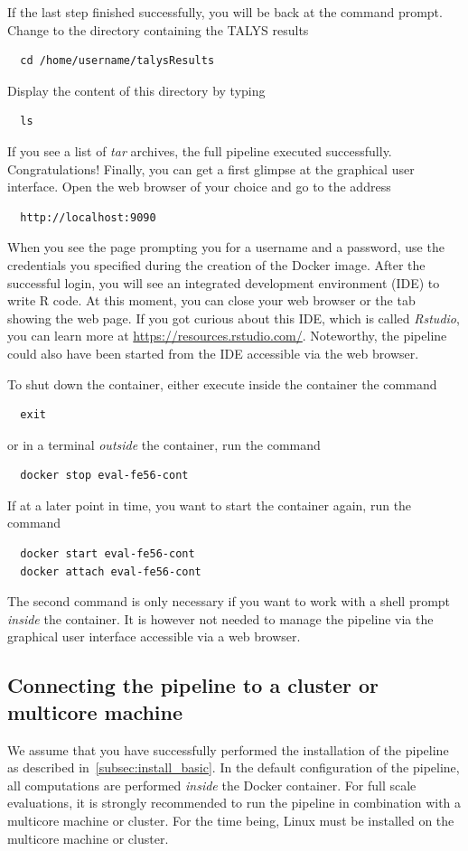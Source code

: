 \documentclass[12pt,a4paper]{scrartcl}
\begin{document}
If the last step finished successfully, you will be back at the command prompt.
Change to the directory containing the TALYS results
\begin{verbatim}
  cd /home/username/talysResults
\end{verbatim}
Display the content of this directory by typing
\begin{verbatim}
  ls
\end{verbatim}
If you see a list of \textit{tar} archives, the full pipeline executed successfully. Congratulations!
Finally, you can get a first glimpse at the graphical user interface.
Open the web browser of your choice and go to the address
\begin{verbatim}
  http://localhost:9090
\end{verbatim}
When you see the page prompting you for a username and a password,
use the credentials you specified during the creation of the Docker image.
After the successful login, you will see an integrated development environment (IDE) to write R code.
At this moment, you can close your web browser or the tab showing the web page.
If you got curious about this IDE, which is called \textit{Rstudio}, you can learn more at \url{https://resources.rstudio.com/}.
Noteworthy, the pipeline could also have been started from the IDE accessible via the web browser.

To shut down the container, either execute inside the container the command
\begin{verbatim}
  exit
\end{verbatim}
or in a terminal \textit{outside} the container, run the command
\begin{verbatim}
  docker stop eval-fe56-cont
\end{verbatim}
If at a later point in time, you want to start the container again, run the command
\begin{verbatim}
  docker start eval-fe56-cont
  docker attach eval-fe56-cont
\end{verbatim}
The second command is only necessary if you want to work with a shell prompt \textit{inside} the container.
It is however not needed to manage the pipeline via the graphical user interface accessible via a web browser.

 \subsection{Connecting the pipeline to a cluster or multicore machine}
 \label{subsec:install_multicore}
 We assume that you have successfully performed the installation of the pipeline as described in~\cref{subsec:install_basic}.
 In the default configuration of the pipeline, all computations are performed \textit{inside} the Docker container.
 For full scale evaluations, it is strongly recommended to run the pipeline in combination with a multicore machine or cluster.
 For the time being, Linux must be installed on the multicore machine or cluster.
\end{document}
